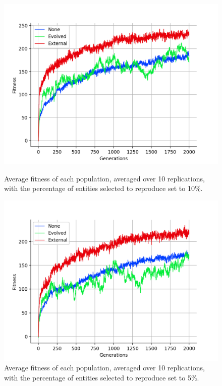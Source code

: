 \documentclass[12pt,a4paper,twoside,openright]{report}
\begin{document}
\begin{figure}[t]
   \centering
   \begin{minipage}{0.49\textwidth}
          \centering
          \captionsetup{width=.9\linewidth}
          \includegraphics[width=1.\linewidth]{results/average-keep10.png}
          \caption{Average fitness of each population, averaged over 10 replications, with the percentage of entities selected to reproduce set to 10\%.}
          \label{fig:average-keep10}
   \end{minipage}
   \begin{minipage}{0.49\textwidth}
          \centering
          \captionsetup{width=.9\linewidth}
          \includegraphics[width=1.\linewidth]{results/average-keep05.png}
          \caption{Average fitness of each population, averaged over 10 replications, with the percentage of entities selected to reproduce set to 5\%.}
          \label{fig:average-keep05}
   \end{minipage}
\end{figure}
\end{document}
